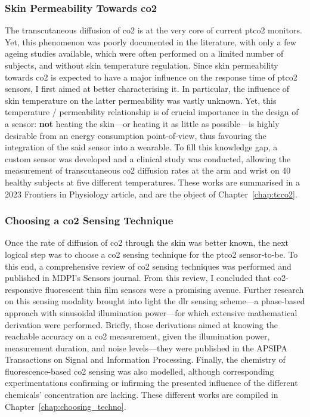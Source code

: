 \subsubsection{Skin Permeability Towards \texorpdfstring{\gls{co2}}{CO2}}

The transcutaneous diffusion of \gls{co2} is at the very core of current \gls{ptco2} monitors. Yet, this phenomenon was poorly documented in the literature, with only a few ageing studies available, which were often performed on a limited number of subjects, and without skin temperature regulation. Since skin permeability towards \gls{co2} is expected to have a major influence on the response time of \gls{ptco2} sensors, I first aimed at better characterising it. In particular, the influence of skin temperature on the latter permeability was vastly unknown. Yet, this temperature / permeability relationship is of crucial importance in the design of a sensor: \textbf{not} heating the skin---or heating it as little as possible---is highly desirable from an energy consumption point-of-view, thus favouring the integration of the said sensor into a wearable. To fill this knowledge gap, a custom sensor was developed and a clinical study was conducted, allowing the measurement of transcutaneous \gls{co2} diffusion rates at the arm and wrist on 40 healthy subjects at five different temperatures. These works are summarised in a 2023 Frontiers in Physiology article\cite{dervieux2023rate}, and are the object of Chapter~\ref{chap:tcco2}.

\subsubsection{Choosing a \texorpdfstring{\gls{co2}}{CO2} Sensing Technique}

Once the rate of diffusion of \gls{co2} through the skin was better known, the next logical step was to choose a \gls{co2} sensing technique for the \gls{ptco2} sensor-to-be. To this end, a comprehensive review of \gls{co2} sensing techniques was performed and published in MDPI's Sensors journal\cite{dervieux2022}. From this review, I concluded that \gls{co2}-responsive fluorescent thin film sensors were a promising avenue. Further research on this sensing modality brought into light the \gls{dlr} sensing scheme---a phase-based approach with sinusoidal illumination power\cite{klimant2001_pap}---for which extensive mathematical derivation were performed. Briefly, those derivations aimed at knowing the reachable accuracy on a \gls{co2} measurement, given the illumination power, measurement duration, and noise levels---they were published in the 
APSIPA Transactions on Signal and Information Processing\cite{dervieux2024phase}. Finally, the chemistry of fluorescence-based \gls{co2} sensing was also modelled, although corresponding experimentations confirming or infirming the presented influence of the different chemicals' concentration are lacking. These different works are compiled in Chapter~\ref{chap:choosing_techno}.

